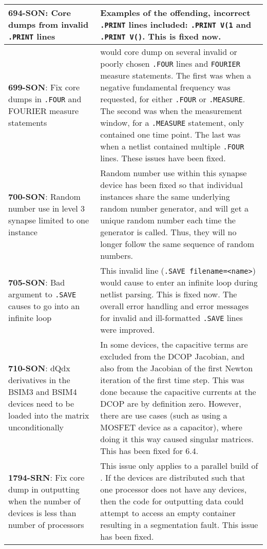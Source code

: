{\begin{longtable}[h] {>{\raggedright\small}m{2in}|>{\raggedright\let\\\tabularnewline\small}m{3.5in}}
     \textbf{694-SON}: Core dumps from invalid \texttt{.PRINT} lines & Examples of the
     offending, incorrect \texttt{.PRINT} lines included: \texttt{.PRINT V(1} and
     \texttt{.PRINT V()}. This is fixed now.  
     \\ \hline

     \textbf{699-SON}: Fix core dumps in \texttt{.FOUR} and FOURIER measure
     statements & \Xyce{} would core dump on several invalid or poorly
     chosen \texttt{.FOUR} lines and \texttt{FOURIER} measure statements.
     The first was when a negative fundamental frequency was requested, for
     either \texttt{.FOUR} or \texttt{.MEASURE}.  The second was when
     the measurement window, for a \texttt{.MEASURE} statement, only contained
     one time point.  The last was when a netlist contained multiple 
     \texttt{.FOUR} lines.  These issues have been fixed.  
     \\ \hline

     \textbf{700-SON}: Random number use in level 3 synapse limited to one
     instance & Random number use within this synapse device has been fixed so
     that individual instances share the same underlying random number
     generator, and will get a unique random number each time the generator is
     called.  Thus, they will no longer follow the same sequence of random
     numbers.
     \\ \hline

     \textbf{705-SON}: Bad argument to \texttt{.SAVE} causes \Xyce{} to go into an infinite loop &
     This invalid line (\texttt{.SAVE filename=<name>}) would cause \Xyce{} to 
     enter an infinite loop during netlist parsing.  This is fixed now.  The overall
     error handling and error messages for invalid and ill-formatted \texttt{.SAVE} lines 
     were improved.
     \\ \hline

     \textbf{710-SON}: dQdx derivatives in the BSIM3 and BSIM4 devices need to be 
     loaded into the matrix unconditionally &
     In some devices, the capacitive terms are excluded from the DCOP Jacobian, and
     also from the Jacobian of the first Newton iteration of the first time step.
     This was done because the capacitive currents at the DCOP are by definition zero.
     However, there are use cases (such as using a MOSFET device as a capacitor), where
     doing it this way caused singular matrices.  This has been fixed for \Xyce{} 6.4.
     \\ \hline

     \textbf{1794-SRN}: Fix core dump in outputting when the number of devices is less
     than number of processors & This issue only applies to a parallel build of \Xyce{}.
     If the devices are distributed such that one processor does not have any
     devices, then the code for outputting data could attempt to access an empty 
     container resulting in a segmentation fault.  This issue has been fixed.
     \\ \hline


\end{longtable}}
